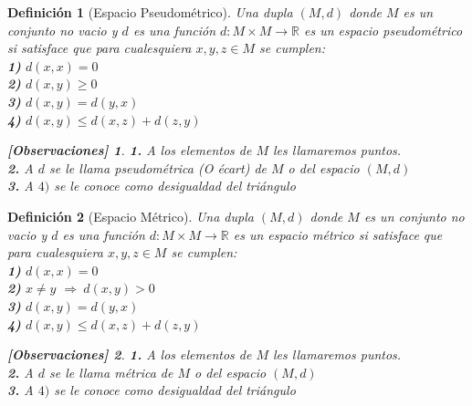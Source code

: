 \documentclass[oneside]{book} %
\theoremstyle{Teorema}
\newtheorem{Definicion}{Definición}[chapter]
\theoremstyle{Ejemplos}
\theoremstyle{[Obs]}
\newtheorem*{Obs}{[Observaciones]}
\renewcommand{\{}{\left\lbrace} %
\renewcommand{\}}{\right\rbrace} %
\newcommand{\R}{\mathbb{R}} %
\newcommand{\Imp}{$\Rightarrow\ $} %
\begin{document}
			\begin{Definicion}[Espacio Pseudométrico]
				
				Una dupla $(M, d)$ donde $M$ es un conjunto no vacio y $d$ es una función $d : M \times M \to \R$ es un espacio pseudométrico si satisface que para cualesquiera $x, y, z \in M$ se cumplen: \\

				\textbf{1)} $d(x, x) = 0$ \\

				\textbf{2)} $d(x, y) \geq 0$ \\

				\textbf{3)} $d(x, y) = d(y, x)$ \\

				\textbf{4)} $d(x, y) \leq d(x, z) + d(z, y)$ \\

				\begin{Obs}
				
					\hfill
				
					\textbf{1.} A los elementos de $M$ les llamaremos puntos. \\

					\textbf{2.} A $d$ se le llama pseudométrica (O écart) de $M$ o del espacio $(M, d)$ \\

					\textbf{3.} A \textbf{$4)$} se le conoce como desigualdad del triángulo
				
				\end{Obs}

			\end{Definicion}

			\begin{Definicion}[Espacio Métrico]

				Una dupla $(M, d)$ donde $M$ es un conjunto no vacio y $d$ es una función $d : M \times M \to \R$ es un espacio métrico si satisface que para cualesquiera $x, y, z \in M$ se cumplen: \\

				\textbf{1)} $d(x, x) = 0$ \\

				\textbf{2)} $x \neq y$ \Imp $d(x, y) > 0$ \\

				\textbf{3)} $d(x, y) = d(y, x)$ \\

				\textbf{4)} $d(x, y) \leq d(x, z) + d(z, y)$ \\

				\begin{Obs}
				
					\hfill
				
					\textbf{1.} A los elementos de $M$ les llamaremos puntos. \\

					\textbf{2.} A $d$ se le llama métrica de $M$ o del espacio $(M, d)$ \\

					\textbf{3.} A \textbf{$4)$} se le conoce como desigualdad del triángulo
				
				\end{Obs}

			\end{Definicion}
\end{document}
